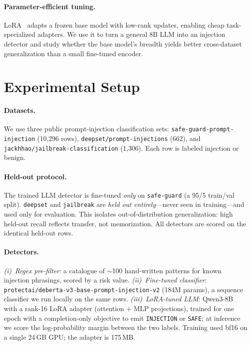 \documentclass[11pt]{article}
\begin{document}
\paragraph{Parameter-efficient tuning.}
LoRA~\citep{hu2022lora} adapts a frozen base model with low-rank updates, enabling cheap
task-specialized adapters. We use it to turn a general 8B LLM into an injection detector and study
whether the base model's breadth yields better cross-dataset generalization than a small fine-tuned
encoder.

\section{Experimental Setup}\label{sec:setup}
\paragraph{Datasets.} We use three public prompt-injection classification sets:
\texttt{safe-guard-prompt-injection} (10{,}296 rows), \texttt{deepset/prompt-injections} (662), and
\texttt{jackhhao/jailbreak-classification} (1{,}306). Each row is labeled injection or benign.

\paragraph{Held-out protocol.} The trained LLM detector is fine-tuned \emph{only} on
\texttt{safe-guard} (a 95/5 train/val split). \texttt{deepset} and \texttt{jailbreak} are
\emph{held out entirely}---never seen in training---and used only for evaluation. This isolates
out-of-distribution generalization: high held-out recall reflects transfer, not memorization. All
detectors are scored on the identical held-out rows.

\paragraph{Detectors.}
\emph{(i)~Regex pre-filter}: a catalogue of $\sim$100 hand-written patterns for known
injection phrasings, scored by a risk value.
\emph{(ii)~Fine-tuned classifier}: \texttt{protectai/deberta-v3-base-prompt-injection-v2}
(184M params), a sequence classifier we run locally on the same rows.
\emph{(iii)~LoRA-tuned LLM}: Qwen3-8B~\citep{qwen3} with a rank-16 LoRA adapter (attention $+$ MLP
projections), trained for one epoch with a completion-only objective to emit \texttt{INJECTION}
or \texttt{SAFE}; at inference we score the log-probability margin between the two labels. Training
used bf16 on a single 24\,GB GPU; the adapter is 175\,MB.
\end{document}
